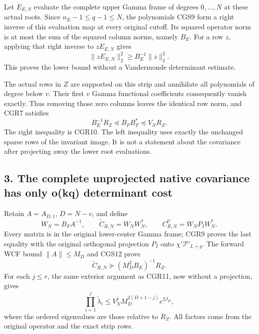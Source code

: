 \documentclass[11pt]{article}
\begin{document}
Let \(E_{E,N}\) evaluate the complete upper Gamma frame of degrees \(0,\ldots,N\) at these actual roots. Since \(n_E-1\le q-1\le N\), the polynomials CGS9 form a right inverse of this evaluation map at every original cutoff. Its squared operator norm is at most the sum of the squared column norms, namely \(B_E\). For a row \(z\), applying that right inverse to \(zE_{E,N}\) gives \[
\|zE_{E,N}\|_2^2\ge B_E^{-1}\|z\|_2^2.
\tag{CGS11}
\] This proves the lower bound without a Vandermonde determinant estimate.

The actual rows in \(Z\) are supported on this strip and annihilate all polynomials of degree below \(v\). Their first \(v\) Gamma functional coefficients consequently vanish exactly. Thus removing those zero columns leaves the identical row norm, and CGR7 satisfies \[
\boxed{B_E^{-1}R_Z\preceq B_FB_F^*\preceq V_NR_Z.}
\tag{CGS12}
\] The right inequality is CGR10. The left inequality uses exactly the unchanged sparse rows of the invariant image. It is not a statement about the covariance after projecting away the lower root evaluations.

\subsection{3. The complete unprojected native covariance has only o(kq) determinant cost}\label{the-complete-unprojected-native-covariance-has-only-okq-determinant-cost}

Retain \(A=A_{D,1}\), \(D=N-v\), and define \[
W_N=B_FA^{-1},\qquad
\widetilde C_{R,N}=W_NW_N^*,\qquad
C_{R,N}^U=W_NP_IW_N^*.
\tag{CGS13}
\] Every matrix is in the original lower-center Gamma frame; CGR9 proves the last equality with the original orthogonal projection \(P_I\) onto \(\chi'\mathcal P'_{L+g}\). The forward WCF bound \(\|A\|\le M_D\) and CGS12 prove \[
\widetilde C_{R,N}\succeq
           (M_D^2B_E)^{-1}R_Z.
\tag{CGS14}
\] For each \(j\le r\), the same exterior argument as CGR11, now without a projection, gives \[
\prod_{i=1}^j\widetilde\lambda_i
\le V_N^jM_D^{2(D+1-j)}e^{2J_D},
\tag{CGS15}
\] where the ordered eigenvalues are those relative to \(R_Z\). All factors come from the original operator and the exact strip rows.
\end{document}
